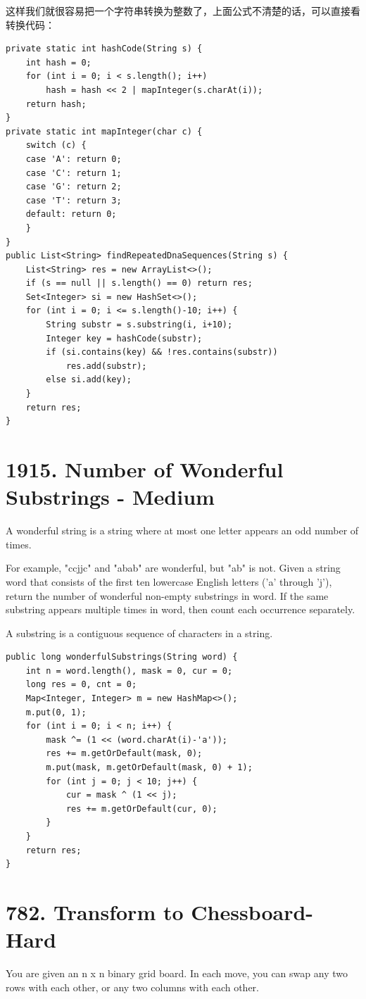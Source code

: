 \documentclass[9pt, b5paaper]{book}
\begin{document}
这样我们就很容易把一个字符串转换为整数了，上面公式不清楚的话，可以直接看转换代码：

\begin{verbatim}
private static int hashCode(String s) {
    int hash = 0;
    for (int i = 0; i < s.length(); i++) 
        hash = hash << 2 | mapInteger(s.charAt(i));
    return hash;
}
private static int mapInteger(char c) {
    switch (c) {
    case 'A': return 0;
    case 'C': return 1;
    case 'G': return 2;
    case 'T': return 3;
    default: return 0;
    }
}
public List<String> findRepeatedDnaSequences(String s) {
    List<String> res = new ArrayList<>();
    if (s == null || s.length() == 0) return res;
    Set<Integer> si = new HashSet<>();
    for (int i = 0; i <= s.length()-10; i++) {
        String substr = s.substring(i, i+10);
        Integer key = hashCode(substr);
        if (si.contains(key) && !res.contains(substr))
            res.add(substr);
        else si.add(key);
    }
    return res;
}
\end{verbatim}
\section{1915. Number of Wonderful Substrings - Medium}
\label{sec-10-8}
A wonderful string is a string where at most one letter appears an odd number of times.

For example, "ccjjc" and "abab" are wonderful, but "ab" is not.
Given a string word that consists of the first ten lowercase English letters ('a' through 'j'), return the number of wonderful non-empty substrings in word. If the same substring appears multiple times in word, then count each occurrence separately.

A substring is a contiguous sequence of characters in a string.
\begin{verbatim}
public long wonderfulSubstrings(String word) {
    int n = word.length(), mask = 0, cur = 0;
    long res = 0, cnt = 0;
    Map<Integer, Integer> m = new HashMap<>();
    m.put(0, 1);
    for (int i = 0; i < n; i++) {
        mask ^= (1 << (word.charAt(i)-'a'));
        res += m.getOrDefault(mask, 0);
        m.put(mask, m.getOrDefault(mask, 0) + 1);
        for (int j = 0; j < 10; j++) {
            cur = mask ^ (1 << j);
            res += m.getOrDefault(cur, 0);
        }
    }
    return res;
}
\end{verbatim}

\section{782. Transform to Chessboard- Hard}
\label{sec-10-9}
You are given an n x n binary grid board. In each move, you can swap any two rows with each other, or any two columns with each other.
\end{document}
